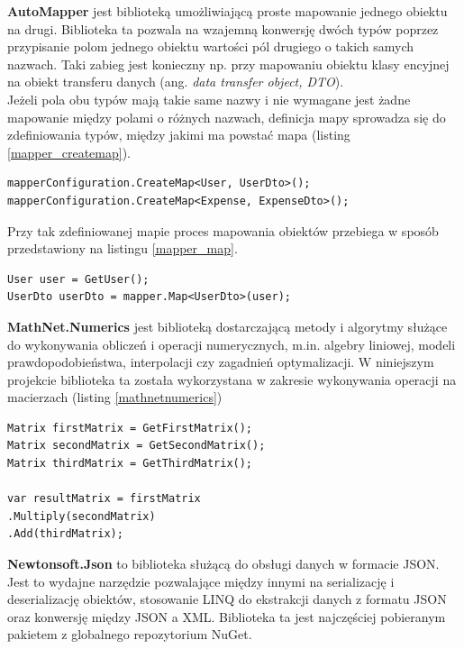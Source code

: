 \textbf{AutoMapper} jest biblioteką umożliwiającą proste mapowanie jednego obiektu na drugi.\cite{automapper} Biblioteka ta pozwala na wzajemną konwersję dwóch typów poprzez przypisanie polom jednego obiektu wartości pól drugiego o takich samych nazwach. Taki zabieg jest konieczny np. przy mapowaniu obiektu klasy encyjnej na obiekt transferu danych (ang. \textit{data transfer object, DTO}).\\
Jeżeli pola obu typów mają takie same nazwy i nie wymagane jest żadne mapowanie między polami o różnych nazwach, definicja mapy sprowadza się do zdefiniowania typów, między jakimi ma powstać mapa (listing \ref{mapper_createmap}).
\begin{lstlisting}[label={mapper_createmap}, caption={Definiowanie mapowania między dwoma typami.}, captionpos=b]
mapperConfiguration.CreateMap<User, UserDto>();
mapperConfiguration.CreateMap<Expense, ExpenseDto>();
\end{lstlisting}
Przy tak zdefiniowanej mapie proces mapowania obiektów przebiega w sposób przedstawiony na listingu \ref{mapper_map}.
\begin{lstlisting}[label={mapper_map}, caption={Mapowanie jednego obiektu na drugi.}, captionpos=b]
User user = GetUser();
UserDto userDto = mapper.Map<UserDto>(user);
\end{lstlisting}

\textbf{MathNet.Numerics} jest biblioteką dostarczającą metody i algorytmy służące do wykonywania obliczeń i operacji numerycznych, m.in. algebry liniowej, modeli prawdopodobieństwa, interpolacji czy zagadnień optymalizacji.\cite{mathnetnumerics} W niniejszym projekcie biblioteka ta została wykorzystana w zakresie wykonywania operacji na macierzach (listing \ref{mathnetnumerics})
\begin{lstlisting}[label={mathnetnumerics}, caption={Operacje na macierzach przy użyciu biblioteki MathNet.Numerics.}, captionpos=b]
Matrix firstMatrix = GetFirstMatrix();
Matrix secondMatrix = GetSecondMatrix();
Matrix thirdMatrix = GetThirdMatrix();

var resultMatrix = firstMatrix
.Multiply(secondMatrix)
.Add(thirdMatrix);
\end{lstlisting}

\textbf{Newtonsoft.Json} to biblioteka służącą do obsługi danych w formacie JSON. Jest to wydajne narzędzie pozwalające między innymi na serializację i deserializację obiektów, stosowanie LINQ do ekstrakcji danych z formatu JSON oraz konwersję między JSON a XML.\cite{newtonsoft} Biblioteka ta jest najczęściej pobieranym pakietem z globalnego repozytorium NuGet.\cite{nugetstats}
